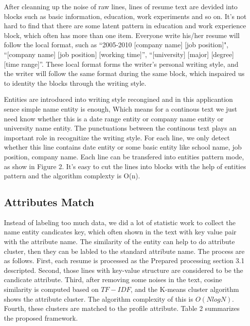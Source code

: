 \documentclass{acm_proc_article-sp}
\begin{document}
After cleanning up the noise of raw lines, lines of resume text are devided into blocks such as basic information, education, work experiments and so on. 
It's not hard to find that there are some latent pattern in education and work experience block, which often has more than one item. 
Everyone write his/her resume will follow the local format, such as ``2005-2010 [company name] [job position]", ``[company name] [job position] [working time]'', ``[university] [major] [degree] [time range]''. 
These local format forms the writer's personal writing style, and the writer will follow the same format during the same block, which inspaired us to identity the blocks through the writing style.

Entities are introduced into writing style recongined and in this applicantion sence simple name entity is enough, Which means for a continous text we just need know whether this is a date range entity or company name entity or university name entity.
The punctuations between the continous text plays an important role in recognitize the writing style. 
For each line, we only detect whether this line contains date entity or some basic entity like school name, job position, company name.
Each line can be transfered into entities pattern mode, as show in Figure 2. 
It's easy to cut the lines into blocks with the help of entities pattern and the algorithm complexty is O(n).


\subsection{Attributes Match}

Instead of labeling too much data, we did a lot of statistic work to collect the name entity candicates key, which often shown in the text with key value pair with the attribute name.
The similarity of the entity can help to do attribute cluster, then they can be labled to the standard attribute name.
The process are as follows.
First, each resume is processed as the Prepared processing section 3.1 descripted.
Second, those lines with key-value structure are considered to be the candicate attribute.
Third, after removing some noises in the text, cosine similarity is computed based on $TF-IDF$, and the K-means cluster algorithm shows the attribute cluster.
The algorithm complexity of this is $O(NlogN)$.
Fourth, these clusters are matched to the profile attribute.
Table 2 summarizes the proposed framework.
\end{document}
